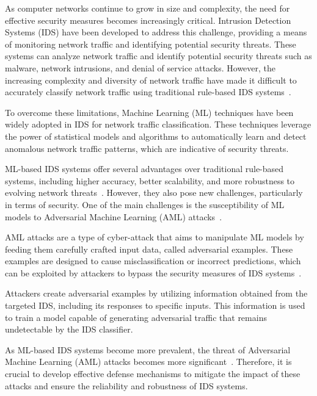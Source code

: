 As computer networks continue to grow in size and complexity, the need for effective security measures becomes
increasingly critical.
Intrusion Detection Systems (IDS) have been developed to address this challenge, providing a means of monitoring
network traffic and identifying potential security threats.
These systems can analyze network traffic and identify potential security threats such as malware, network intrusions,
and denial of service attacks.
However, the increasing complexity and diversity of network traffic have made it difficult to accurately classify
network traffic using traditional rule-based IDS systems~\cite{thakkar2020review}.

To overcome these limitations, Machine Learning (ML) techniques have been widely adopted in IDS for network traffic
classification.
These techniques leverage the power of statistical models and algorithms to automatically learn and detect anomalous
network traffic patterns, which are indicative of security threats.

ML-based IDS systems offer several advantages over traditional rule-based systems, including higher accuracy, better
scalability, and more robustness to evolving network threats~\cite{abdallah2022intrusion, maseer2021benchmarking}.
However, they also pose new challenges, particularly in terms of security.
One of the main challenges is the susceptibility of ML models to Adversarial Machine Learning (AML)
attacks~\cite{huang2011adversarial}.

AML attacks are a type of cyber-attack that aims to manipulate ML models by feeding them carefully crafted input data,
called adversarial examples.
These examples are designed to cause misclassification or incorrect predictions, which can be exploited by attackers to
bypass the security measures of IDS systems~\cite{zhao2021attackgan, lin2022idsgan, liu2022vulnergan}.

Attackers create adversarial examples by utilizing information obtained from the targeted IDS, including its responses
to specific inputs.
This information is used to train a model capable of generating adversarial traffic that remains undetectable by the
IDS classifier.

As ML-based IDS systems become more prevalent, the threat of Adversarial Machine Learning (AML) attacks becomes more
significant~\cite{duy2021digfupas}.
Therefore, it is crucial to develop effective defense mechanisms to mitigate the impact of these attacks and ensure the
reliability and robustness of IDS systems.

